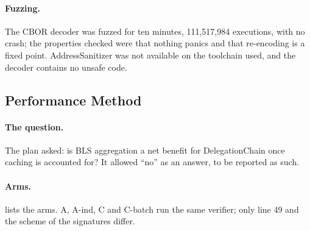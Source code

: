 \documentclass[11pt,a4paper]{article}
\begin{document}
\begin{table}[t]
\centering
\small
\caption{Differential test of the containment procedure and its per-path
checks against an enumerating oracle (seed 56324). Soundness: the
procedure never answers true where the oracle answers false.
Completeness: the share of the oracle's true answers that the procedure
also finds. These are test statistics, not benchmark results.}
\label{tab:oracle}
\end{table}

\paragraph{Fuzzing.}
The CBOR decoder was fuzzed for ten minutes, 111,517,984 executions,
with no crash; the properties checked were that nothing panics and that
re-encoding is a fixed point. AddressSanitizer was not available on the
toolchain used, and the decoder contains no unsafe code.

\subsection{Performance Method}
\label{sec:eval-method}

\paragraph{The question.}
The plan asked: is BLS aggregation a net benefit for DelegationChain
once caching is accounted for? It allowed ``no'' as an answer, to be
reported as such.

\paragraph{Arms.}
 lists the arms. A, A-ind, C and C-batch run the same
verifier; only line 49 and the scheme of the signatures differ.
\end{document}
